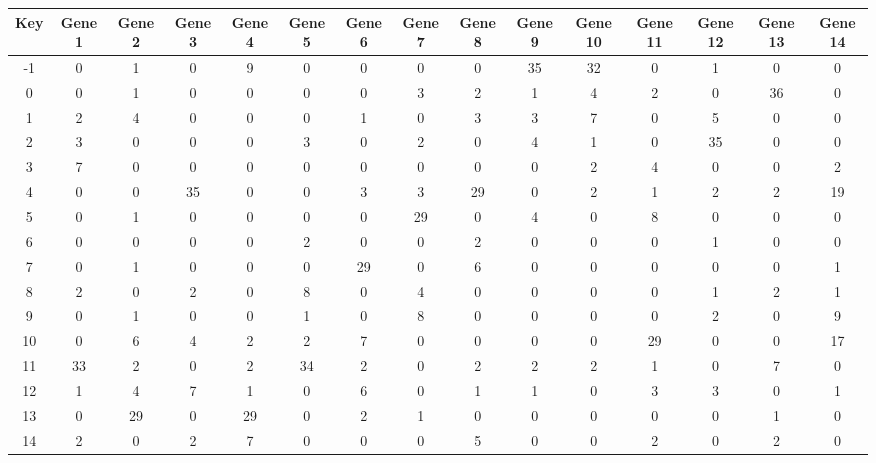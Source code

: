 \begin{tabular}{|c|c|c|c|c|c|c|c|c|c|c|c|c|c|c|}
\hline
Key & Gene 1 & Gene 2 & Gene 3 & Gene 4 & Gene 5 & Gene 6 & Gene 7 & Gene 8 & Gene 9 & Gene 10 & Gene 11 & Gene 12 & Gene 13 & Gene 14 \\
\hline
-1 & 0 & 1 & 0 & 9 & 0 & 0 & 0 & 0 & 35 & 32 & 0 & 1 & 0 & 0 \\
0 & 0 & 1 & 0 & 0 & 0 & 0 & 3 & 2 & 1 & 4 & 2 & 0 & 36 & 0 \\
1 & 2 & 4 & 0 & 0 & 0 & 1 & 0 & 3 & 3 & 7 & 0 & 5 & 0 & 0 \\
2 & 3 & 0 & 0 & 0 & 3 & 0 & 2 & 0 & 4 & 1 & 0 & 35 & 0 & 0 \\
3 & 7 & 0 & 0 & 0 & 0 & 0 & 0 & 0 & 0 & 2 & 4 & 0 & 0 & 2 \\
4 & 0 & 0 & 35 & 0 & 0 & 3 & 3 & 29 & 0 & 2 & 1 & 2 & 2 & 19 \\
5 & 0 & 1 & 0 & 0 & 0 & 0 & 29 & 0 & 4 & 0 & 8 & 0 & 0 & 0 \\
6 & 0 & 0 & 0 & 0 & 2 & 0 & 0 & 2 & 0 & 0 & 0 & 1 & 0 & 0 \\
7 & 0 & 1 & 0 & 0 & 0 & 29 & 0 & 6 & 0 & 0 & 0 & 0 & 0 & 1 \\
8 & 2 & 0 & 2 & 0 & 8 & 0 & 4 & 0 & 0 & 0 & 0 & 1 & 2 & 1 \\
9 & 0 & 1 & 0 & 0 & 1 & 0 & 8 & 0 & 0 & 0 & 0 & 2 & 0 & 9 \\
10 & 0 & 6 & 4 & 2 & 2 & 7 & 0 & 0 & 0 & 0 & 29 & 0 & 0 & 17 \\
11 & 33 & 2 & 0 & 2 & 34 & 2 & 0 & 2 & 2 & 2 & 1 & 0 & 7 & 0 \\
12 & 1 & 4 & 7 & 1 & 0 & 6 & 0 & 1 & 1 & 0 & 3 & 3 & 0 & 1 \\
13 & 0 & 29 & 0 & 29 & 0 & 2 & 1 & 0 & 0 & 0 & 0 & 0 & 1 & 0 \\
14 & 2 & 0 & 2 & 7 & 0 & 0 & 0 & 5 & 0 & 0 & 2 & 0 & 2 & 0 \\
\hline
\end{tabular}